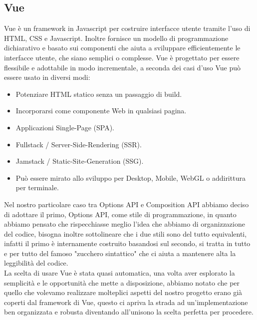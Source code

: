 \documentclass{article}
\begin{document}
\subsection{Vue}
Vue\cite{vue} è un framework in Javascript per costruire interfacce utente tramite l'uso di HTML, CSS e Javascript. Inoltre fornisce un modello di programmazione dichiarativo e basato sui componenti che aiuta a sviluppare efficientemente le interfacce utente, che siano semplici o complesse. Vue è progettato per essere flessibile e adottabile in modo incrementale, a seconda dei casi d'uso Vue può essere usato in diversi modi:
\begin{itemize}
	\item Potenziare HTML statico senza un passaggio di build.
	\item Incorporarsi come componente Web in qualsiasi pagina.
	\item Applicazioni Single-Page (SPA).
	\item Fullstack / Server-Side-Rendering (SSR).
	\item Jamstack / Static-Site-Generation (SSG).
	\item Può essere mirato allo sviluppo per Desktop, Mobile, WebGL o addirittura per terminale.
\end{itemize}
Nel nostro particolare caso tra Options API e Composition API abbiamo deciso di adottare il primo, Options API, come stile di programmazione, in quanto abbiamo pensato che rispecchiasse meglio l'idea che abbiamo di organizzazione del codice, bisogna inoltre sottolineare che i due stili sono del tutto equivalenti, infatti il primo è internamente costruito basandosi sul secondo, si tratta in tutto e per tutto del famoso "zucchero sintattico" che ci aiuta a mantenere alta la leggibilità del codice.\\
La scelta di usare Vue è stata quasi automatica, una volta aver esplorato la semplicità e le opportunità che mette a disposizione, abbiamo notato che per quello che volevamo realizzare molteplici aspetti del nostro progetto erano già coperti dal framework di Vue, questo ci apriva la strada ad un'implementazione ben organizzata e robusta diventando all'unisono la scelta perfetta per procedere.
\end{document}
